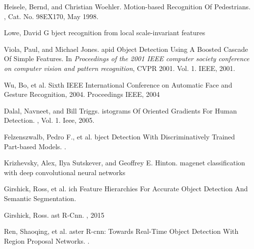 \documentclass{svproc}
\begin{document}
%
%
\begin{thebibliography}{6}
Heisele, Bernd, and Christian Woehler.
\newblock Motion-based {R}ecognition {O}f {P}edestrians.
,
Cat. No. 98EX170, May 1998.

Lowe, David G
bject recognition from local scale-invariant features


Viola, Paul, and Michael Jones.
apid {O}bject {D}etection {U}sing {A} {B}oosted {C}ascade {O}f {S}imple {F}eatures.
\newblock In {\em Proceedings of the 2001 IEEE computer society conference on computer vision and pattern recognition}, CVPR 2001. Vol. 1. IEEE, 2001.

Wu, Bo, et al.
\newblock Sixth IEEE International Conference on Automatic Face and Gesture Recognition, 2004. Proceedings IEEE, 2004

Dalal, Navneet, and Bill Triggs.
istograms {O}f {O}riented {G}radients {F}or {H}uman {D}etection.
,
Vol. 1. Ieee, 2005.

Felzenszwalb, Pedro F., et al.
bject {D}etection {W}ith {D}iscriminatively {T}rained {P}art-based {M}odels.
.

Krizhevsky, Alex, Ilya Sutskever, and Geoffrey E. Hinton. 
magenet classification with deep convolutional neural networks 

Girshick, Ross, et al.
ich {F}eature {H}ierarchies {F}or {A}ccurate {O}bject {D}etection {A}nd {S}emantic {S}egmentation.


Girshick, Ross.
ast {R}-{C}nn.
,
2015

Ren, Shaoqing, et al.
aster {R}-cnn: {T}owards {R}eal-{T}ime {O}bject {D}etection {W}ith {R}egion {P}roposal {N}etworks.
.


\end{thebibliography}
\end{document}
